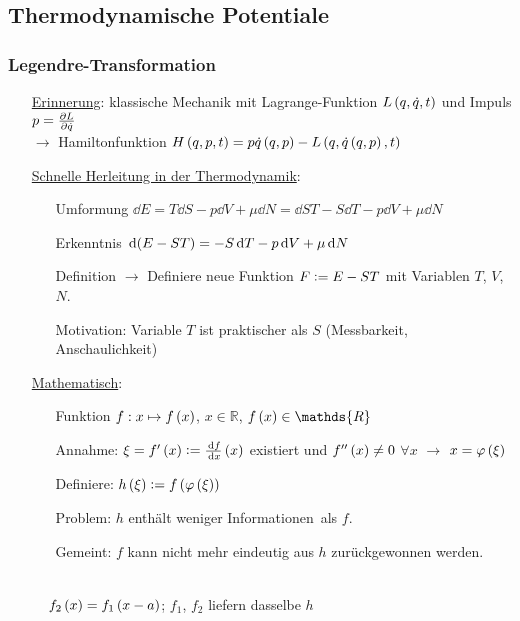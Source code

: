 \subsection{Thermodynamische Potentiale}
\subsubsection{Legendre-Transformation}

\begin{itemize}[align=left]
  \item[\uline{Erinnerung}:] klassische Mechanik mit Lagrange-Funktion $L\left( q,\dot{q},t \right)$ und Impuls $p = \frac{\partial L}{\partial \dot{q}}$\\
  $\rightarrow$ Hamiltonfunktion $H\left( q,p,t \right) = p\dot{q}\left( q,p \right) - L \left( q,\dot{q}\left( q,p \right),t \right)$
  \item[\uline{Schnelle Herleitung in der Thermodynamik}:] \begin{itemize}[align=left]
    \item[Umformung]$\dd{E} = T\dd{S} -p \dd{V} + \mu\dd{N} = \dd{ST} - S\dd{T} - p\dd{V} + \mu\dd{N}$
    \item[Erkenntnis]$\,\text d{\left( E-ST \right)} = - S\,\text d{T} -p \,\text d{V} + \mu\,\text d{N}$
    \item[Definition]$\rightarrow$ Definiere neue Funktion $F\vcentcolon = E-ST$ mit Variablen $T$, $V$, $N$.
    \item[Motivation:] Variable $T$ ist praktischer als $S$ (Messbarkeit, Anschaulichkeit)
  \end{itemize}
  \item[\uline{Mathematisch}:] \begin{itemize}[align=left]
    \item[Funktion] $f: x \mapsto f\left( x \right)$, $x\in\mathds{R}$, $f\norBra{x} \in\mathds{R}$
    \item[Annahme:] $\xi = f'\left( x \right) \vcentcolon = \frac{\,\text d{f}}{\,\text d{x}}\left( x \right)$ existiert und $f''\left( x \right) \neq 0$ $\forall x$ $\rightarrow$ $x = \varphi\left( \xi \right)$
    \item[Definiere:] $h\left( \xi \right) \vcentcolon = f\left( \varphi\left( \xi \right) \right)$
    \item[Problem:] $h$ enthält \glqq weniger Informationen\grqq\ als $f$.
    \item[Gemeint:] $f$ kann nicht mehr eindeutig aus $h$ zurückgewonnen werden.
  \end{itemize}
\end{itemize}

\begin{figure}[H]
  \centering
  \\
  $f_2\left( x \right) = f_1\left( x-a \right)$; $f_1$, $f_2$ liefern dasselbe $h$
\end{figure}

